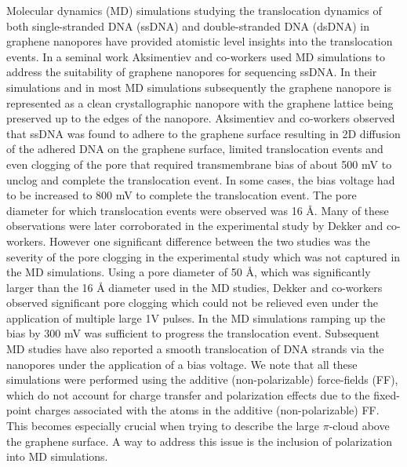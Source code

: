 Molecular dynamics (MD) simulations studying the translocation dynamics of both single-stranded DNA (ssDNA) and double-stranded DNA (dsDNA) in graphene nanopores have provided atomistic level insights into the translocation events.\supercite{barati_farimani_dna_2017} In a seminal work Aksimentiev and co-workers used MD simulations to address the suitability of graphene nanopores for sequencing ssDNA.\supercite{wells_assessing_2012} In their simulations and in most MD simulations subsequently the graphene nanopore is represented as a clean crystallographic nanopore with the graphene lattice being preserved up to the edges of the nanopore. Aksimentiev and co-workers observed that ssDNA was found to adhere to the graphene surface resulting in 2D diffusion of the adhered DNA on the graphene surface, limited translocation events and even clogging of the pore that required transmembrane bias of about 500 mV to unclog and complete the translocation event. In some cases, the bias voltage had to be increased to 800 mV to complete the translocation event. The pore diameter for which translocation events were observed was 16 Å. Many of these observations were later corroborated in the experimental study by Dekker and co-workers.\supercite{schneider_tailoring_2013,heerema_graphene_2016} However one significant difference between the two studies was the severity of the pore clogging in the experimental study which was not captured in the MD simulations. Using a pore diameter of 50 Å, which was significantly larger than the 16 Å diameter used in the MD studies, Dekker and co-workers observed significant pore clogging which could not be relieved even under the application of multiple large 1V pulses.\supercite{schneider_tailoring_2013} In the MD simulations ramping up the bias by 300 mV was sufficient to progress the translocation event. Subsequent MD studies have also reported a smooth translocation of DNA strands via the nanopores under the application of a bias voltage.\supercite{tyagi_revealing_2019} We note that all these simulations were performed using the additive (non-polarizable) force-fields (FF), which do not account for charge transfer and polarization effects due to the fixed-point charges associated with the atoms in the additive (non-polarizable) FF. This becomes especially crucial when trying to describe the large $\pi$-cloud above the graphene surface. A way to address this issue is the inclusion of polarization into MD simulations. 

